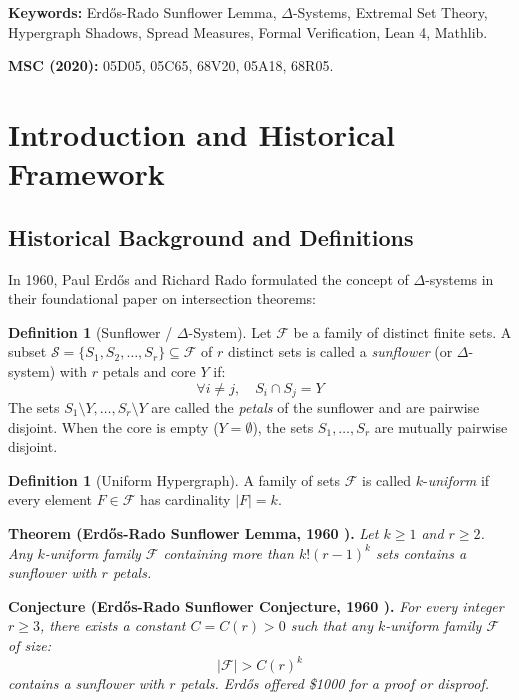 \documentclass[11pt,a4paper]{article}
\theoremstyle{definition}
\newtheorem{definition}[theorem]{Definition}
\begin{document}
\vspace{0.5em}
\noindent\textbf{Keywords:} Erd\H{o}s-Rado Sunflower Lemma, $\Delta$-Systems, Extremal Set Theory, Hypergraph Shadows, Spread Measures, Formal Verification, Lean 4, Mathlib.

\noindent\textbf{MSC (2020):} 05D05, 05C65, 68V20, 05A18, 68R05.

\tableofcontents
\newpage

\section{Introduction and Historical Framework}

\subsection{Historical Background and Definitions}
In 1960, Paul Erd\H{o}s and Richard Rado \cite{erdos1960} formulated the concept of $\Delta$-systems in their foundational paper on intersection theorems:

\begin{definition}[Sunflower / $\Delta$-System]\label{def:sunflower}
Let $\mathcal{F}$ be a family of distinct finite sets. A subset $\mathcal{S} = \{S_1, S_2, \dots, S_r\} \subseteq \mathcal{F}$ of $r$ distinct sets is called a \emph{sunflower} (or $\Delta$-system) with $r$ petals and core $Y$ if:
\begin{equation}\label{eq:sunflower_def}
\forall i \ne j, \quad S_i \cap S_j = Y
\end{equation}
The sets $S_1 \setminus Y, \dots, S_r \setminus Y$ are called the \emph{petals} of the sunflower and are pairwise disjoint.
When the core is empty ($Y = \emptyset$), the sets $S_1, \dots, S_r$ are mutually pairwise disjoint.
\end{definition}

\begin{definition}[Uniform Hypergraph]\label{def:uniform}
A family of sets $\mathcal{F}$ is called $k$-\emph{uniform} if every element $F \in \mathcal{F}$ has cardinality $|F| = k$.
\end{definition}

\noindent\textbf{Theorem (Erd\H{o}s-Rado Sunflower Lemma, 1960 \cite{erdos1960}).} \textit{Let $k \ge 1$ and $r \ge 2$. Any $k$-uniform family $\mathcal{F}$ containing more than $k!(r-1)^k$ sets contains a sunflower with $r$ petals.}

\noindent\textbf{Conjecture (Erd\H{o}s-Rado Sunflower Conjecture, 1960 \cite{erdos1960}).} \textit{For every integer $r \ge 3$, there exists a constant $C = C(r) > 0$ such that any $k$-uniform family $\mathcal{F}$ of size:}
\begin{equation}\label{eq:sunflower_conj}
|\mathcal{F}| > C(r)^k
\end{equation}
\textit{contains a sunflower with $r$ petals. Erd\H{o}s offered \$1000 for a proof or disproof.}
\end{document}

